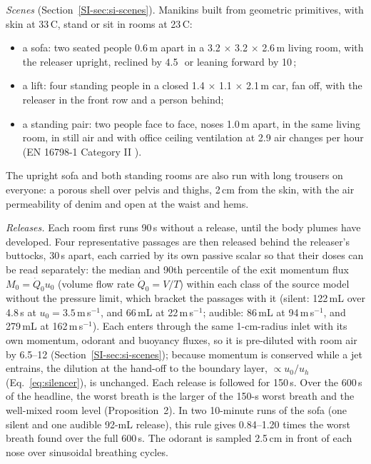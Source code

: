 \emph{Scenes} (Section~\ref{SI-sec:si-scenes}). Manikins built from geometric primitives, with skin at
33\,\textdegree C, stand or sit in rooms at 23\,\textdegree C:
\begin{itemize}
  \item a sofa: two seated people 0.6\,m apart in a 3.2 $\times$ 3.2 $\times$ 2.6\,m living room, with the releaser
  upright, reclined by 4.5\,\textdegree\ or leaning forward by 10\,\textdegree;
  \item a lift: four standing people in a closed 1.4 $\times$ 1.1 $\times$ 2.1\,m car, fan off, with the releaser
  in the front row and a person behind;
  \item a standing pair: two people face to face, noses 1.0\,m apart, in the same living room, in still air and with
  office ceiling ventilation at 2.9 air changes per hour (EN 16798-1 Category II \cite{olesen2024}).
\end{itemize}
The upright sofa and both standing rooms are also run with long trousers on everyone: a porous shell over pelvis and
thighs, 2\,cm from the skin, with the air permeability of denim and open at the waist and hems.

\emph{Releases.} Each room first runs 90\,s without a release, until the body plumes have developed. Four
representative passages are then released behind the releaser's buttocks, 30\,s apart, each carried by its own
passive scalar so that their doses can be read separately: the median and 90th percentile of the exit momentum flux
$M_0 = \dot Q_0u_0$ (volume flow rate $\dot Q_0 = V/T$) within each class of the source model without the pressure
limit, which bracket the passages with it (silent: 122\,mL over 4.8\,s at $u_0 = 3.5$\,m\,s$^{-1}$, and
66\,mL at 22\,m\,s$^{-1}$; audible: 86\,mL at 94\,m\,s$^{-1}$, and 279\,mL at 162\,m\,s$^{-1}$). Each enters
through the same 1-cm-radius inlet with its own momentum, odorant and buoyancy fluxes, so it is pre-diluted with room
air by 6.5--12 (Section~\ref{SI-sec:si-scenes}); because momentum is conserved while a jet entrains, the dilution at
the hand-off to the boundary layer, $\propto u_0/u_h$ (Eq.~\eqref{eq:silencer}), is unchanged. Each release is
followed for 150\,s. Over the 600\,s of the headline, the worst breath is the larger of the 150-s worst breath
and the well-mixed room level (Proposition~2). In two 10-minute runs of the sofa (one silent and one audible 92-mL
release), this rule gives 0.84--1.20 times the worst breath found over the full 600\,s. The odorant is sampled 2.5\,cm in front
of each nose over sinusoidal breathing cycles.

